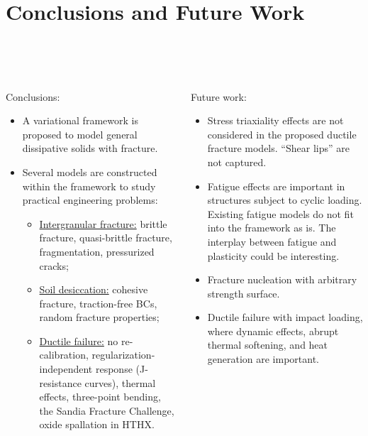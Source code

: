 \section{Conclusions and Future Work}

\sectioncover

\subsection{\ }

\begin{frame}
  \begin{columns}
    \begin{column}{0.5\textwidth}
      Conclusions:
      \begin{itemize}
        \setlength\itemsep{5pt}
        \item A variational framework is proposed to model general dissipative solids with fracture.
        \item Several models are constructed within the framework to study practical engineering problems:
              \begin{itemize}
                \setlength\itemsep{3pt}
                \item \underline{Intergranular fracture:} brittle fracture, quasi-brittle fracture, fragmentation, pressurized cracks;
                \item \underline{Soil desiccation:} cohesive fracture, traction-free BCs, random fracture properties;
                \item \underline{Ductile failure:} no re-calibration, regularization-independent response (J-resistance curves), thermal effects, three-point bending, the Sandia Fracture Challenge, oxide spallation in HTHX.
              \end{itemize}
      \end{itemize}
    \end{column}
    \pause
    \begin{column}{0.5\textwidth}
      Future work:
      \begin{itemize}
        \item Stress triaxiality effects are not considered in the proposed ductile fracture models. ``Shear lips'' are not captured.
        \item Fatigue effects are important in structures subject to cyclic loading. Existing fatigue models do not fit into the framework as is. The interplay between fatigue and plasticity could be interesting.
        \item Fracture nucleation with arbitrary strength surface.
        \item Ductile failure with impact loading, where dynamic effects, abrupt thermal softening, and heat generation are important.
      \end{itemize}
    \end{column}
  \end{columns}
\end{frame}
